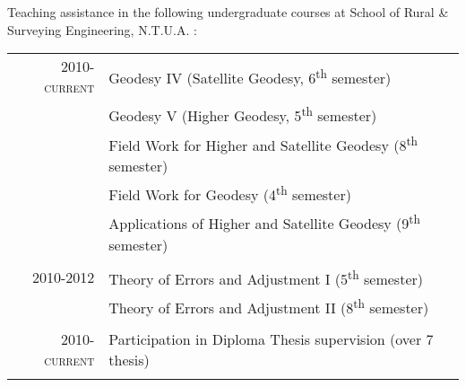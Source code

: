 \documentclass[9pt]{extarticle} %
\begin{document}
Teaching assistance in the following undergraduate courses at School of Rural \& Surveying Engineering, N.T.U.A. :

\begin{longtable}{rl}

\textsc{2010-current} & 
  Geodesy IV (Satellite Geodesy, 6\textsuperscript{th} semester)\\
  & Geodesy V (Higher Geodesy, 5\textsuperscript{th} semester)\\
  & Field Work for Higher and Satellite Geodesy (8\textsuperscript{th} semester)\\
  & Field Work for Geodesy (4\textsuperscript{th} semester)\\
  & Applications of Higher and Satellite Geodesy (9\textsuperscript{th} semester)\\
&\\

\textsc{2010-2012} & 
  Theory of Errors and Adjustment I (5\textsuperscript{th} semester)\\
  & Theory of Errors and Adjustment II (8\textsuperscript{th} semester)\\
&\\

\textsc{2010-current} & 
  Participation in Diploma Thesis supervision (over 7 thesis)\\
&\\

\end{longtable}
\medskip

\end{document}
